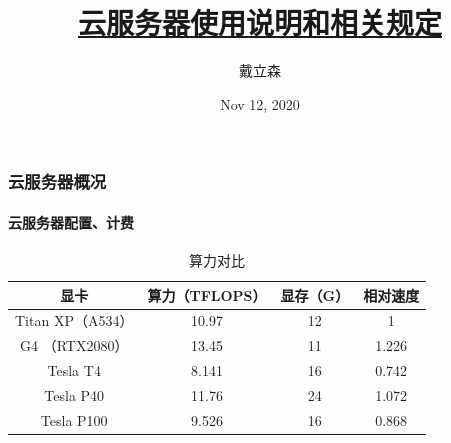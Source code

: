 \documentclass[10pt]{beamer}
\title{
    \href{https://github.com/Ls-Dai/Cloud-Sever-Tutorial}{云服务器使用说明和相关规定}
}
\author{戴立森}
\date{Nov 12, 2020}
\begin{document}
    \maketitle
    \begin{frame}
        \frametitle{云服务器概况}
            \framesubtitle{云服务器配置、计费}

            {\small
            \begin{table}[h]
                \centering
                \caption{算力对比}\label{tab:tab1}
                    \begin{tabular}{|c|c|c|c|}
                        \hline
                        显卡 & 算力（TFLOPS） & 显存（G） & 相对速度 \\
                        \hline
                        Titan XP（A534） & 10.97 & 12 & 1 \\
                        \hline
                        G4 （RTX2080） & 13.45 & 11 & 1.226 \\
                        \hline
                        Tesla T4 & 8.141 & 16 & 0.742 \\
                        \hline
                        Tesla P40 & 11.76 & 24 & 1.072 \\
                        \hline
                        Tesla P100 & 9.526 & 16 & 0.868 \\
                        \hline
                    \end{tabular}
            \end{table}
            }

    \end{frame}
\end{document}
